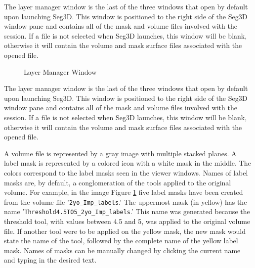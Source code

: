 \documentclass[fleqn,11pt,openany]{book}
\begin{document}
The layer manager window is the last of the three windows that open by default upon launching Seg3D.  
This window is positioned to the right side of the Seg3D window pane and contains all of the mask and volume files involved with the session.  
If a file is not selected when Seg3D launches, this window will be blank, otherwise it will contain the volume and mask surface files associated with the opened file.

\begin{figure}[ht!]
\caption{Layer Manager Window}\label{fig:LayerWindow}
\end{figure}

The layer manager window is the last of the three windows that open by default upon launching Seg3D.  
This window is positioned to the right side of the Seg3D window pane and contains all of the mask and volume files involved with the session.  
If a file is not selected when Seg3D launches, this window will be blank, otherwise it will contain the volume and mask surface files associated with the opened file.

A volume file is represented by a gray image with multiple stacked planes.  
A label mask is represented by a colored icon with a white mask in the middle.  
The colors correspond to the label masks seen in the viewer windows.
Names of label masks are, by default, a conglomeration of the tools applied to the original volume.
For example, in the image Figure \ref{fig:LayerWindow} five label masks have been created from the volume file '\verb|2yo_Imp_labels|.' 
The uppermost mask (in yellow) has the name '\verb|Threshold4.5TO5_2yo_Imp_labels|.' 
This name was generated because the threshold tool, with values between 4.5 and 5, was applied to the original volume file. 
If another tool were to be applied on the yellow mask, the new mask would state the name of the tool, followed by the complete name of the yellow label mask.  
Names of masks can be manually changed by clicking the current name and typing in the desired text.
\end{document}
